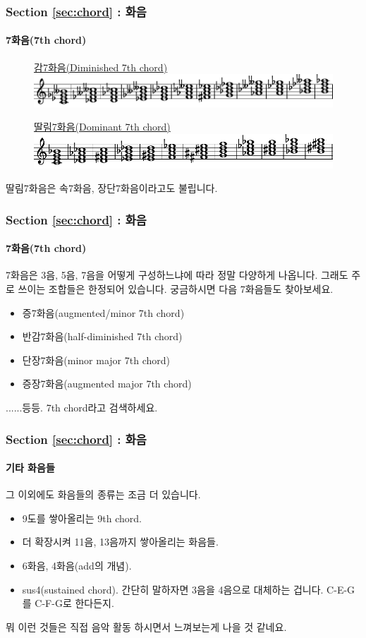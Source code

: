 \documentclass{beamer}
\begin{document}
	\begin{frame}
		\frametitle{Section \ref{sec:chord} : 화음}
		\framesubtitle{7화음(7th chord)}
		\begin{figure}
			\centering
			\color{cyan}\href{run:res/mp3/9/scale/chromatic_diminished_7th_chord.mp3}{감7화음(Diminished 7th chord)}
			\includegraphics[width=\textwidth]{res/pdf/9/scale/diminished_7th.pdf}
		\end{figure}
		\begin{figure}
			\centering
			\color{cyan}\href{run:res/mp3/9/scale/chromatic_dominant_7th_chord.mp3}{딸림7화음(Dominant 7th chord)}
			\includegraphics[width=\textwidth]{res/pdf/9/scale/dominant_7th.pdf}
		\end{figure}
		딸림7화음은 속7화음, 장단7화음이라고도 불립니다.
	\end{frame}
	
	\begin{frame}
		\frametitle{Section \ref{sec:chord} : 화음}
		\framesubtitle{7화음(7th chord)}
		7화음은 3음, 5음, 7음을 어떻게 구성하느냐에 따라 정말 다양하게 나옵니다. 그래도 주로 쓰이는 조합들은 한정되어 있습니다. 궁금하시면 다음 7화음들도 찾아보세요.
		\begin{itemize}
			\item 증7화음(augmented/minor 7th chord)
			\item 반감7화음(half-diminished 7th chord)
			\item 단장7화음(minor major 7th chord)
			\item 증장7화음(augmented major 7th chord)
		\end{itemize}
		......등등. 7th chord라고 검색하세요.
	\end{frame}
	
	\begin{frame}
		\frametitle{Section \ref{sec:chord} : 화음}
		\framesubtitle{기타 화음들}
		그 이외에도 화음들의 종류는 조금 더 있습니다.
		\begin{itemize}
			\item 9도를 쌓아올리는 9th chord.
			\item 더 확장시켜 11음, 13음까지 쌓아올리는 화음들.
			\item 6화음, 4화음(add의 개념).
			\item sus4(sustained chord). 간단히 말하자면 3음을 4음으로 대체하는 겁니다. C-E-G를 C-F-G로 한다든지.
		\end{itemize}
		뭐 이런 것들은 직접 음악 활동 하시면서 느껴보는게 나을 것 같네요. %
	\end{frame}
	
\end{document}
